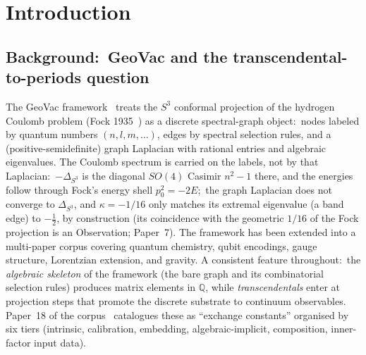 \documentclass[11pt,a4paper]{article}
\theoremstyle{plain}
\theoremstyle{definition}
\newcommand{\sthree}{S^{3}}
\newcommand{\sfive}{S^{5}}
\newcommand{\Q}{\mathbb{Q}}
\begin{document}
\begin{abstract}
\begin{itemize}
    at the level of motivic periods.
\end{itemize}
The three sub-mechanisms are not set-theoretically disjoint
(joint engagement is the typical case in physical observables);
the master Mellin index $k$ indexes the period-ring contribution
of each elementary spectral object (a reading, not a consequence of the
conditional case-exhaustion theorem).  We catalogue
witnesses from across the corpus (Papers 2, 18, 28, 38, 40, 43, 50,
51) and indicate open questions:\ $S_{\min}$ is now fully resolved ---
both remaining Hoffman $t$-values are identified and
$S_{\min} \in \Q[\pi^2, \ln 2, \zeta(3), \zeta(5)]$ in explicit closed
form (Paper~28); inhomogeneous extension to
non-static Robertson--Walker substrates; cross-manifold extension to
the Bargmann--Segal Hardy lattice on $\sfive$; and inner-factor
Yukawa coupling content.
\end{abstract}

\tableofcontents

\section{Introduction}
\label{sec:intro}

\subsection{Background:\ GeoVac and the transcendental-to-periods question}

The GeoVac framework~\cite{loutey_paper7,loutey_paper18} treats the
$\sthree$ conformal projection of the hydrogen Coulomb problem
(Fock 1935~\cite{fock1935}) as a discrete spectral-graph object:\
nodes labeled by quantum numbers $(n, l, m, \ldots)$, edges by
spectral selection rules, and a (positive-semidefinite) graph Laplacian
with rational entries and algebraic eigenvalues.  The Coulomb spectrum
is carried on the labels, not by that Laplacian:\ $-\Delta_{\sthree}$
is the diagonal $SO(4)$ Casimir $n^2 - 1$ there, and the energies
follow through Fock's energy shell $p_0^2 = -2E$;\ the graph Laplacian
does not converge to $\Delta_{\sthree}$, and $\kappa = -1/16$ only
matches its extremal eigenvalue (a band edge) to $-\tfrac12$, by
construction (its coincidence with the geometric $1/16$ of the Fock
projection is an Observation; Paper~7).
The framework has been extended into a multi-paper corpus covering
quantum chemistry, qubit encodings, gauge structure, Lorentzian
extension, and gravity.  A consistent feature throughout:\ the
\emph{algebraic skeleton} of the framework (the bare graph and its
combinatorial selection rules) produces matrix elements in $\Q$, while
\emph{transcendentals} enter at projection steps that promote the
discrete substrate to continuum observables.  Paper~18 of the
corpus~\cite{loutey_paper18} catalogues these as ``exchange
constants'' organised by six tiers (intrinsic, calibration,
embedding, algebraic-implicit, composition, inner-factor input data).
\end{document}
